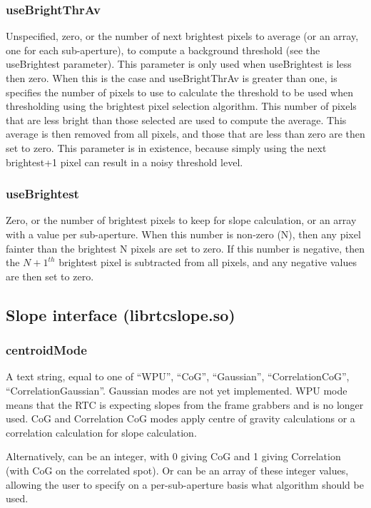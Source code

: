 \documentclass[a4,10pt]{article}
\begin{document}
\subsubsection{useBrightThrAv}
Unspecified, zero, or the number of next brightest pixels to average
(or an array, one for each sub-aperture),
to compute a background threshold (see the useBrightest parameter).
This parameter is only used when useBrightest is less then zero.  When
this is the case and useBrightThrAv is greater than one, is specifies
the number of pixels to use to calculate the threshold to be used when
thresholding using the brightest pixel selection algorithm.  This
number of pixels that are less bright than those selected are used to
compute the average.  This average is then removed from all pixels,
and those that are less than zero are then set to zero.  This
parameter is in existence, because simply using the next brightest+1
pixel can result in a noisy threshold level.

\subsubsection{useBrightest}
Zero, or the number of brightest pixels to keep for slope calculation,
or an array with a value per sub-aperture.  When this number is
non-zero (N), then any pixel fainter than the brightest N pixels are
set to zero.  If this number is negative, then the $N+1^{th}$
brightest pixel is subtracted from all pixels, and any negative values
are then set to zero.

\subsection{Slope interface (librtcslope.so)}
\subsubsection{centroidMode}
A text string, equal to one of ``WPU'', ``CoG'', ``Gaussian'',
``CorrelationCoG'', ``CorrelationGaussian''.  Gaussian modes are not
yet implemented.  WPU mode means that the RTC is expecting slopes from
the frame grabbers and is no longer used.  CoG and Correlation CoG
modes apply centre of gravity calculations or a correlation
calculation for slope calculation.

Alternatively, can be an integer, with 0 giving CoG and 1 giving
Correlation (with CoG on the correlated spot).  Or can be an array of
these integer values, allowing the user to specify on a
per-sub-aperture basis what algorithm should be used.
\end{document}
